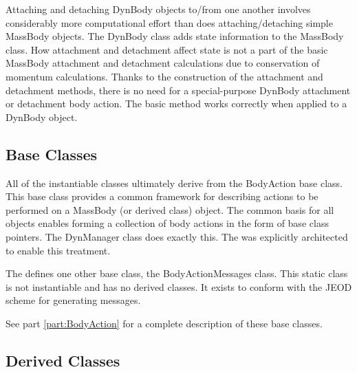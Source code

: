 Attaching and detaching DynBody objects to/from one another  involves
considerably more computational effort than does attaching/detaching
simple MassBody objects. The
DynBody class adds state information to the
MassBody class. How attachment and detachment affect state is not a part
of the basic MassBody attachment and detachment calculations due to
conservation of momentum calculations.
Thanks to the construction of the attachment and detachment methods,
there is no need for a special-purpose DynBody attachment or detachment
body action. The basic method works correctly when applied to a DynBody object.

\subsection{Base Classes}

All of the instantiable \ModelDesc classes ultimately derive from the
BodyAction base class. This base class provides a common framework for
describing actions to be performed on a MassBody (or derived class) object.
The common basis for all \ModelDesc objects enables forming a
collection of body actions in the form of base class pointers. The DynManager
class does exactly this. The \ModelDesc was explicitly architected to enable
this treatment.

The \ModelDesc defines one other base class, the BodyActionMessages class.
This static class is not instantiable and has no derived classes. It exists to
conform with the JEOD scheme for generating messages.

See part \ref{part:BodyAction} for a complete description of these
base classes.

\subsection{Derived Classes}

